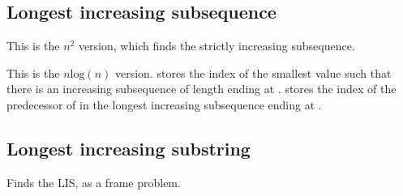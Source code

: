 
\subsection*{Longest increasing subsequence}

This is the $n^2$ version, which finds the strictly increasing subsequence. 



This is the $n\text{log}(n)$ version.  stores the index  of the smallest value  such that there is an increasing subsequence of length  ending at .  stores the index of the predecessor of  in the longest increasing subsequence ending at .



\subsection*{Longest increasing substring}

Finds the LIS, as a frame problem.




\newpage